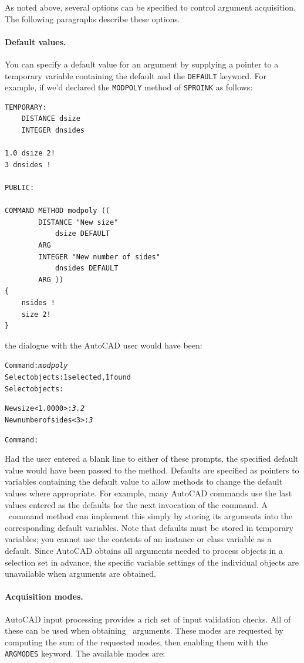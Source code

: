 \documentclass{article}
\begin{document}
As noted above, several options can be specified to control argument
acquisition.  The following paragraphs describe these options.

\paragraph{Default values.}
You can specify a default value for an argument by supplying a pointer
to a temporary variable containing the default and the {\tt DEFAULT}
keyword.  For example, if we'd declared the {\tt MODPOLY} method of
{\tt SPROINK} as follows:

\begin{verbatim}
TEMPORARY:
    DISTANCE dsize
    INTEGER dnsides

1.0 dsize 2!
3 dnsides !

PUBLIC:

COMMAND METHOD modpoly ((
        DISTANCE "New size"
            dsize DEFAULT
        ARG
        INTEGER "New number of sides"
            dnsides DEFAULT
        ARG ))
{
    nsides !
    size 2!
}
\end{verbatim}

the dialogue with the AutoCAD user would have been:

\begin{alltt}
Command: {\em modpoly}
Select objects: 1 selected, 1 found
Select objects:

New size <1.0000>: {\em 3.2}
New number of sides <3>: {\em 3}

Command:
\end{alltt}

Had the user entered a blank line to either of these prompts, the
specified default value would have been passed to the method.
Defaults are specified as pointers to variables containing the default
value to allow methods to change the default values where appropriate.
For example, many AutoCAD commands use the last values entered as the
defaults for the next invocation of the command.  A \cw\ command
method can implement this simply by storing its arguments into the
corresponding default variables.  Note that defaults must be stored in
temporary variables; you cannot use the contents of an instance or
class variable as a default.  Since AutoCAD obtains all arguments
needed to process objects in a selection set in advance, the specific
variable settings of the individual objects are unavailable when
arguments are obtained.

\paragraph{Acquisition modes.}  AutoCAD input processing provides a
rich set of input validation checks.  All of these can be used when
obtaining \cw\ arguments.  These modes are requested by computing the
sum of the requested modes, then enabling them with the {\tt
ARGMODES} keyword.  The available modes are:
\end{document}
